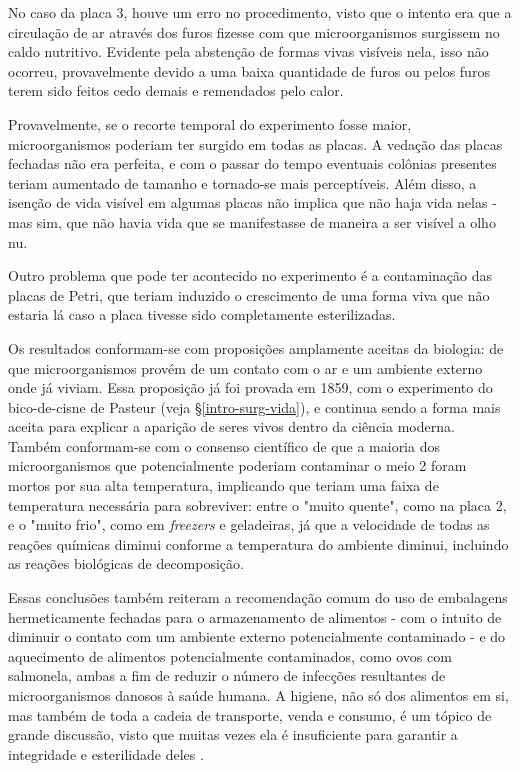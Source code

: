 \documentclass[12pt, titlepage]{article}
\begin{document}
No caso da placa 3, houve um erro no procedimento, visto que o intento era que a circulação de ar através dos furos fizesse com que microorganismos surgissem no caldo nutritivo. Evidente pela abstenção de formas vivas visíveis nela, isso não ocorreu, provavelmente devido a uma baixa quantidade de furos ou pelos furos terem sido feitos cedo demais e remendados pelo calor.

Provavelmente, se o recorte temporal do experimento fosse maior, microorganismos poderiam ter surgido em todas as placas. A vedação das placas fechadas não era perfeita, e com o passar do tempo eventuais colônias presentes teriam aumentado de tamanho e tornado-se mais perceptíveis. Além disso, a isenção de vida visível em algumas placas não implica que não haja vida nelas - mas sim, que não havia vida que se manifestasse de maneira a ser visível a olho nu.

Outro problema que pode ter acontecido no experimento é a contaminação das placas de Petri, que teriam induzido o crescimento de uma forma viva que não estaria lá caso a placa tivesse sido completamente esterilizadas.

Os resultados conformam-se com proposições amplamente aceitas da biologia: de que microorganismos provém de um contato com o ar e um ambiente externo onde já viviam. Essa proposição já foi provada em 1859, com o experimento do bico-de-cisne de Pasteur (veja \S\ref{intro-surg-vida}), e continua sendo a forma mais aceita para explicar a aparição de seres vivos dentro da ciência moderna. Também conformam-se com o consenso científico de que a maioria dos microorganismos que potencialmente poderiam contaminar o meio 2 foram mortos por sua alta temperatura, implicando que teriam uma faixa de temperatura necessária para sobreviver: entre o "muito quente", como na placa 2, e o "muito frio", como em \textit{freezers} e geladeiras, já que a velocidade de todas as reações químicas diminui conforme a temperatura do ambiente diminui, incluindo as reações biológicas de decomposição.

Essas conclusões também reiteram a recomendação comum do uso de embalagens hermeticamente fechadas para o armazenamento de alimentos - com o intuito de diminuir o contato com um ambiente externo potencialmente contaminado - e do aquecimento de alimentos potencialmente contaminados, como ovos com salmonela, ambas a fim de reduzir o número de infecções resultantes de microorganismos danosos à saúde humana. A higiene, não só dos alimentos em si, mas também de toda a cadeia de transporte, venda e consumo, é um tópico de grande discussão, visto que muitas vezes ela é insuficiente para garantir a integridade e esterilidade deles \cite{coelho_milagres_martins_azeredo_santana_2010, balbani2001contaminaccao}.
\end{document}
